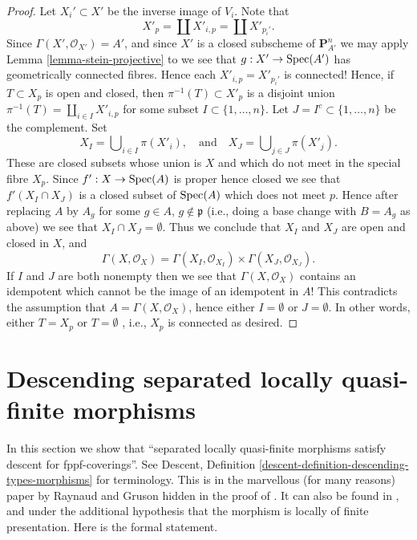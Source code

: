 \begin{proof}
\medskip\noindent
Let $X_i' \subset X'$ be the inverse image of $V_i$.
Note that
$$
X'_p = \coprod X'_{i, p} = \coprod X'_{p_i'}.
$$
Since $\Gamma(X', \mathcal{O}_{X'}) = A'$, and since $X'$
is a closed subscheme of $\mathbf{P}^n_{A'}$ we may apply
Lemma \ref{lemma-stein-projective} to
we see that $g : X' \to \mathop{\rm Spec}(A')$ has geometrically connected fibres.
Hence each $X'_{i, p} = X'_{p_i'}$ is connected!
Hence, if $T \subset X_p$ is open and closed, then
$\pi^{-1}(T) \subset X'_p$ is a disjoint union
$\pi^{-1}(T) = \coprod_{i \in I} X'_{i, p}$ for some subset
$I \subset \{1, \ldots, n\}$. Let $J = I^c \subset \{1, \ldots, n\}$
be the complement. Set
$$
X_I = \bigcup\nolimits_{i \in I} \pi(X'_i),
\quad\text{and}\quad
X_J = \bigcup\nolimits_{j \in J} \pi(X'_j).
$$
These are closed subsets whose union is $X$ and
which do not meet in the special fibre $X_p$.
Since $f' : X \to \mathop{\rm Spec}(A)$ is proper hence closed we see that
$f'(X_I \cap X_J)$ is a closed subset of $\mathop{\rm Spec}(A)$ which
does not meet $p$. Hence after replacing $A$ by $A_g$ for some $g \in A$,
$g \not \in \mathfrak p$ (i.e., doing a base change with $B = A_g$ as
above) we see that $X_I \cap X_J = \emptyset$.
Thus we conclude that $X_I$ and $X_J$ are open and closed in $X$, and
$$
\Gamma(X, \mathcal{O}_X) =
\Gamma(X_I, \mathcal{O}_{X_I}) \times
\Gamma(X_J, \mathcal{O}_{X_J}).
$$
If $I$ and $J$ are both nonempty then we see that $\Gamma(X, \mathcal{O}_X)$
contains an idempotent which cannot be the image of an idempotent in $A$!
This contradicts the assumption that $A = \Gamma(X, \mathcal{O}_X)$, hence
either $I = \emptyset$ or $J = \emptyset$. In other words, either
$T = X_p$ or $T = \emptyset$ , i.e., $X_p$ is connected as desired.
\end{proof}



















\section{Descending separated locally quasi-finite morphisms}
\label{section-separated-locally-quasi-finite}

\noindent
In this section we show that ``separated locally quasi-finite morphisms
satisfy descent for fppf-coverings''. See Descent, Definition
\ref{descent-definition-descending-types-morphisms} for terminology.
This is in the marvellous
(for many reasons) paper by Raynaud and Gruson hidden in the proof
of \cite[Lemma 5.7.1]{GruRay}.
It can also be found in \cite{Murre-representation}, and
\cite[Expos\'e X, Lemma 5.4]{SGA3}
under the additional
hypothesis that the morphism is locally of finite presentation.
Here is the formal statement.

